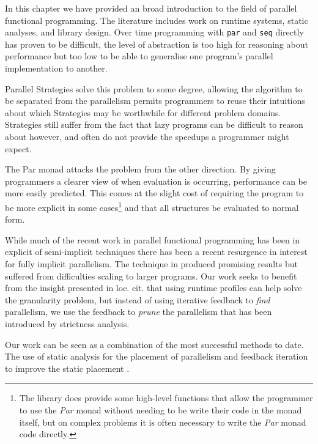 In this chapter we have provided an broad introduction to the field
of parallel functional programming. The literature includes work
on runtime systems, static analyses, and library design. Over time
programming with \verb|par| and \verb|seq| directly has proven to be
difficult, the level of abstraction is too high for reasoning about
performance but too low to be able to generalise one program's parallel
implementation to another.

Parallel Strategies solve this problem to some degree, allowing the algorithm
to be separated from the parallelism permits programmers to reuse their
intuitions about which Strategies may be worthwhile for different problem
domains. Strategies still suffer from the fact that lazy programs can be
difficult to reason about however, and often do not provide the speedups a
programmer might expect.

The \<Par\> monad attacks the problem from the other direction. By giving
programmers a clearer view of when evaluation is occurring, performance can be
more easily predicted. This comes at the slight cost of requiring the program
to be more explicit in some cases\footnote{The library does provide some
high-level functions that allow the programmer to use the \emph{Par} monad
without needing to be write their code in the monad itself, but on complex
problems it is often necessary to write the \emph{Par} monad code directly.}
and that all structures be evaluated to normal form. 

While much of the recent work in parallel functional programming has been in
explicit of semi-implicit techniques there has been a recent resurgence in
interest for fully implicit parallelism. The technique in
\citet{feedbackImplicit} produced promising results but suffered from
difficulties scaling to larger programs. Our work seeks to benefit from the
insight presented in loc. cit. that using runtime profiles can help solve the
granularity problem, but instead of using iterative feedback to \emph{find}
parallelism, we use the feedback to \emph{prune} the parallelism that has been
introduced by strictness analysis.

Our work can be seen as a combination of the most successful methods to date.
The use of static analysis for the placement of parallelism
\citep{hogen1992automatic} and feedback iteration to improve the static
placement \citep{feedbackImplicit}.\nopagebreak
